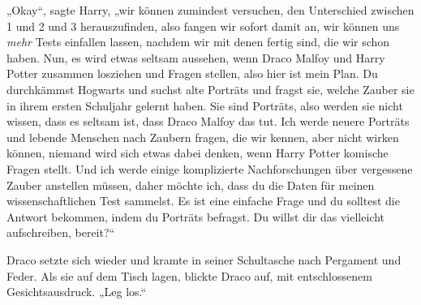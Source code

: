 „Okay“, sagte Harry, „wir können zumindest versuchen, den Unterschied zwischen 1 und 2 und 3 herauszufinden, also fangen wir sofort damit an, wir können uns \emph{mehr} Tests einfallen lassen, nachdem wir mit denen fertig sind, die wir schon haben. Nun, es wird etwas seltsam aussehen, wenn Draco Malfoy und Harry Potter zusammen losziehen und Fragen stellen, also hier ist mein Plan. Du durchkämmst Hogwarts und suchst alte Porträts und fragst sie, welche Zauber sie in ihrem ersten Schuljahr gelernt haben. Sie sind Porträts, also werden sie nicht wissen, dass es seltsam ist, dass Draco Malfoy das tut. Ich werde neuere Porträts und lebende Menschen nach Zaubern fragen, die wir kennen, aber nicht wirken können, niemand wird sich etwas dabei denken, wenn Harry Potter komische Fragen stellt. Und ich werde einige komplizierte Nachforschungen über vergessene Zauber anstellen müssen, daher möchte ich, dass du die Daten für meinen wissenschaftlichen Test sammelst. Es ist eine einfache Frage und du solltest die Antwort bekommen, indem du Porträts befragst. Du willst dir das vielleicht aufschreiben, bereit?“

Draco setzte sich wieder und kramte in seiner Schultasche nach Pergament und Feder. Als sie auf dem Tisch lagen, blickte Draco auf, mit entschlossenem Gesichtsausdruck.
„Leg los.“

